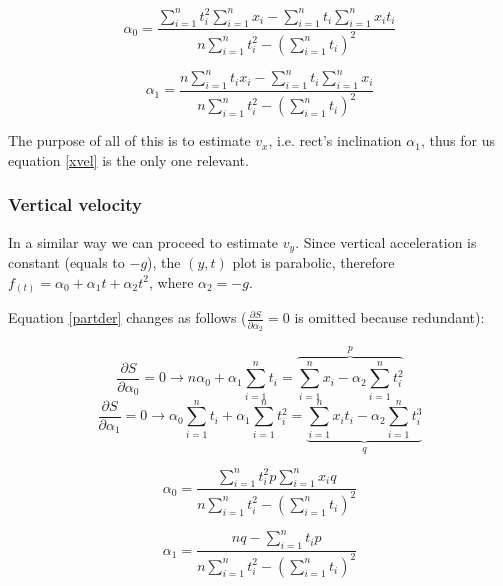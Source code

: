 \documentclass[notitlepage,a4paper,10pt]{article} %
\begin{document}
			\begin{equation}
					\alpha_0 = \frac
					{\sum_{i=1}^n t_i^2 \sum_{i=1}^n x_i - \sum_{i=1}^n t_i \sum_{i=1}^n x_i t_i}
					{n \sum_{i=1}^n t_i^2 - (\sum_{i=1}^n t_i)^2}
			\end{equation}

			\begin{equation} \label{xvel}
					\alpha_1 = \frac
					{n \sum_{i=1}^n t_i x_i - \sum_{i=1}^n t_i \sum_{i=1}^n x_i}
					{n \sum_{i=1}^n t_i^2 - (\sum_{i=1}^n t_i)^2}
			\end{equation}

			The purpose of all of this is to estimate $v_x$, i.e. rect's inclination $\alpha_1$, thus for us equation \eqref{xvel} is the only one relevant.

		\subsubsection{Vertical velocity}

			In a similar way we can proceed to estimate $v_y$. Since vertical acceleration is constant (equals to $-g$), the $(y,t)$ plot is parabolic, therefore $f_{(t)} = \alpha_0 + \alpha_1 t + \alpha_2 t^2$, where $\alpha_2 = -g$.

			Equation \ref{partder} changes as follows ($\frac{\partial S}{\partial \alpha_2} = 0$ is omitted because redundant):

			\begin{equation}
				\frac{\partial S}{\partial \alpha_0} = 0 \to
				n \alpha_0 + \alpha_1 \sum_{i=1}^n t_i =
					\overbrace{\sum_{i=1}^n x_i - \alpha_2 \sum_{i=1}^n t_i^2}^p
			\end{equation}
			\begin{equation}
				\frac{\partial S}{\partial \alpha_1} = 0 \to
				\alpha_0 \sum_{i=1}^n t_i + \alpha_1 \sum_{i=1}^n t_i^2 =
					\underbrace{\sum_{i=1}^n x_i t_i - \alpha_2 \sum_{i=1}^n t_i^3}_q
			\end{equation}

			\begin{equation}
					\alpha_0 = \frac
					{\sum_{i=1}^n t_i^2 p \sum_{i=1}^n x_i q}{n \sum_{i=1}^n t_i^2 - (\sum_{i=1}^n t_i)^2}
			\end{equation}

			\begin{equation} \label{yvel}
					\alpha_1 = \frac
					{n q - \sum_{i=1}^n t_i p}{n \sum_{i=1}^n t_i^2 - (\sum_{i=1}^n t_i)^2}
			\end{equation}
\end{document}
